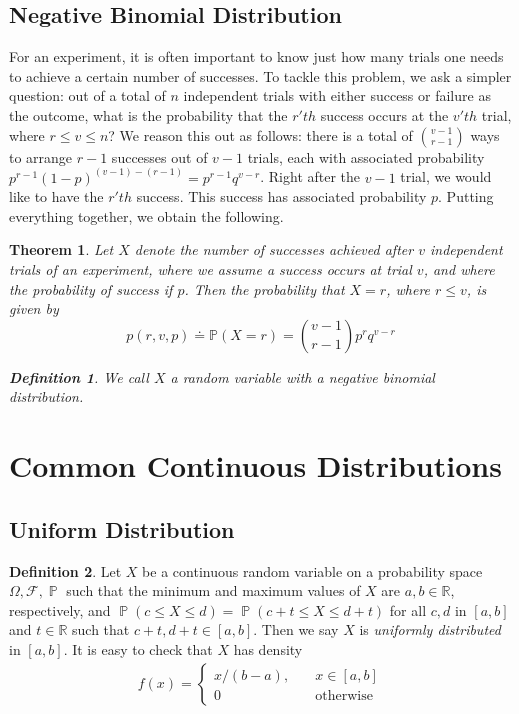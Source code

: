 \documentclass[12pt]{amsbook}
\newcommand{\rr}{\mathbb{R}}
\newcommand{\filter}{\mathcal{F}}
\DeclareMathOperator{\prob}{\mathbb{P}}
\theoremstyle{plain}
\newtheorem{theorem}{Theorem}
\theoremstyle{definition}
\newtheorem*{definition}{Definition}
\theoremstyle{remark}
\numberwithin{equation}{section}  %
\begin{document}
\subsection{Negative Binomial Distribution}
For an experiment, it is often important to know just how many trials
one needs to achieve a certain number of successes. To tackle this problem,
we ask a simpler question: out of a total of $n$ independent trials with
either success or failure as the outcome, what is the probability
that the $r'th$ success occurs at the $v'th$ trial, where $r \le v \le n$?
We reason this out as follows: there is a total of $\binom{v-1}{r-1}$ ways to
arrange $r-1$ successes out of $v-1$ trials, each with associated probability
$p^{r-1}{(1 - p)}^{(v-1) - (r-1)} = p^{r-1}q^{v-r}$. Right after the $v-1$ 
trial, we would like to
have the $r'th$ success. This success has associated probability $p$. Putting
everything together, we obtain the following.
\begin{theorem}
	Let $X$ denote the number of successes achieved after $v$ independent 
	trials of an experiment,
	where we assume a success occurs at trial $v$, and where the probability
	of success if $p$. Then the probability that $X=r$, where $r \le v$, is 
	given by
	\begin{equation*}
		p(r, v, p) \doteq \mathbb{P}(X = r) = \binom{v-1}{r-1} p^{r} q^{v-r}
	\end{equation*}
	\begin{definition}
		We call $X$ a random variable with a \emph{negative binomial 
		distribution}.
	\end{definition}
\end{theorem}
\section{Common Continuous Distributions}
\subsection{Uniform Distribution}
\begin{definition}
	Let $X$ be a continuous random variable on a probability space $\Omega, 
	\filter,
	\prob$ such that the minimum and maximum values of $X$ are $a,b \in \rr$,
	respectively, and $\prob(c \le X \le d ) = \prob(c + t \le X \le d + t)$
	for all $c, d$ in $[a,b]$  and $t \in \rr$ such that $c+t, d+t \in [a,b]$.
	Then we say $X$ is \emph{uniformly distributed} in $[a,b]$. It is easy to 
	check
	that $X$ has density  
	\begin{align*}
		f(x) = \begin{cases}
			x/(b-a), \quad & x \in [a,b] \\
			0 \quad &\text{otherwise}
		\end{cases}
	\end{align*}
\end{definition}
\end{document}
